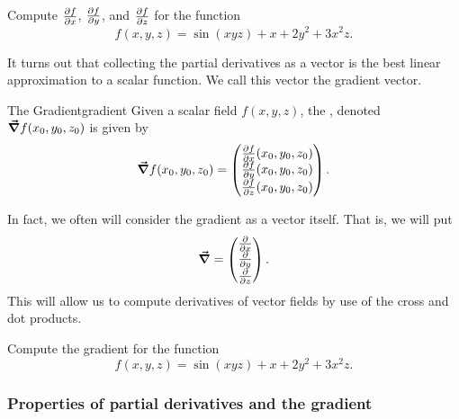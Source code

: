                         \begin{exercise}
                        Compute $\frac{\partial f}{\partial x}$, $\frac{\partial f}{\partial y}$, and $\frac{\partial f}{\partial z}$ for the function 
                        \[
                        f(x,y,z)=\sin(xyz)+x+2y^2+3x^2z.
                        \]
                        \end{exercise}
                        
                        It turns out that collecting the partial derivatives as a vector is the best linear approximation to a scalar function.  We call this vector the gradient vector.
                        
                        \begin{df}{The Gradient}{gradient}
                        Given a scalar field $f(x,y,z)$, the , denoted $\boldsymbol{\vec{\nabla}} f(x_0,y_0,z_0)$ is given by
                        \[
                        \boldsymbol{\vec{\nabla}} f(x_0,y_0,z_0)=\begin{pmatrix} \frac{\partial f}{\partial x}(x_0,y_0,z_0)\\ \frac{\partial f}{\partial y}(x_0,y_0,z_0)\\ \frac{\partial f}{\partial z}(x_0,y_0,z_0)\end{pmatrix}.
                        \]
                        \end{df}
                        
                        In fact, we often will consider the gradient as a vector itself.  That is, we will put
                        \[
                        \boldsymbol{\vec{\nabla}} = \begin{pmatrix} \frac{\partial}{\partial x} \\ \frac{\partial}{\partial y} \\ \frac{\partial}{\partial z} \end{pmatrix}.
                        \]
                        This will allow us to compute derivatives of vector fields by use of the cross and dot products.
                        
                        \begin{exercise}
                        Compute the gradient for the function
                        \[
                        f(x,y,z)=\sin(xyz)+x+2y^2+3x^2z.
                        \]
                        \end{exercise}
                        
                        \subsubsection{Properties of partial derivatives and the gradient}
                        
